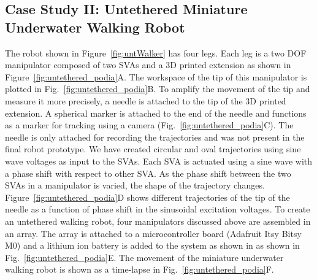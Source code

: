 \subsection{Case Study II: Untethered Miniature Underwater Walking Robot} 
The robot shown in Figure~\ref{fig:untWalker} has four legs. Each leg is a two DOF manipulator composed of two SVAs and a 3D printed extension as shown in Figure~\ref{fig:untethered_podia}A. The workspace of the tip of this manipulator is plotted in Fig.~\ref{fig:untethered_podia}B. To amplify the movement of the tip and measure it more precisely, a needle is attached to the tip of the 3D printed extension. A spherical marker is attached to the end of the needle and functions as a marker for tracking using a camera (Fig.~\ref{fig:untethered_podia}C). The needle is only attached for recording the trajectories and was not present in the final robot prototype. We have created circular and oval trajectories using sine wave voltages as input to the SVAs. Each SVA is actuated using a sine wave with a phase shift with respect to other SVA. As the phase shift between the two SVAs in a manipulator is varied, the shape of the trajectory changes. Figure~\ref{fig:untethered_podia}D shows different trajectories of the tip of the needle as a function of phase shift in the sinusoidal excitation voltages. To create an untethered walking robot, four manipulators discussed above are assembled in an array. The array is attached to a microcontroller board (Adafruit Itsy Bitsy M0) and a lithium ion battery is added to the system as shown in as shown in Fig.~\ref{fig:untethered_podia}E. The movement of the miniature underwater walking robot is shown as a time-lapse in Fig.~\ref{fig:untethered_podia}F.
